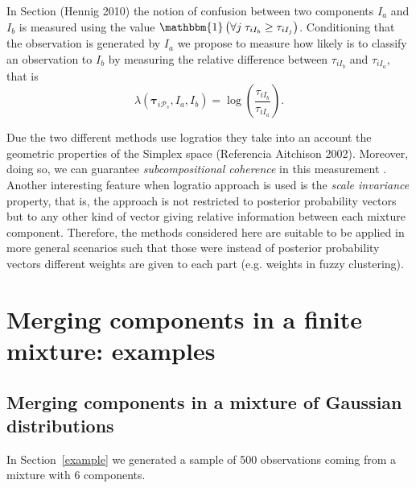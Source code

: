 \documentclass[10pt, a4paper]{article}
\newcommand{\m}[1]{\boldsymbol{#1}}
\begin{document}
\begin{spacing}{1.9}
In Section (Hennig 2010) the notion of confusion between two components $I_a$ and $I_b$ is measured  using the value $\mathbbm{1}\left( \forall j\; \tau_{i I_{b}} \geq \tau_{i I_j} \right)$. Conditioning that the observation is generated by $I_a$ we propose to measure how likely is to classify an observation to $I_b$ by measuring the relative difference between $\tau_{i I_b}$ and $\tau_{i I_a}$, that is 
\[
\lambda(\m\tau_{i \mathcal{P}_s},  I_a,  I_b) = \log \left(\frac{ \tau_{iI_b} }{ \tau_{iI_a} }\right).
\]

Due the two different methods use logratios they take into an account the geometric properties of the Simplex space (Referencia Aitchison 2002).  Moreover, doing so, we can guarantee \emph{subcompositional coherence} in this measurement \citep{aitchison1986statistical}. Another interesting feature when logratio approach is used is the \emph{scale invariance} property, that is, the approach is not restricted to posterior probability vectors but to any other kind of vector giving relative information between each mixture component. Therefore, the methods considered here are suitable to be applied in more general scenarios such that those were instead of posterior probability vectors different weights are given to each part (e.g. weights in fuzzy clustering).


\section{Merging components in a finite mixture: examples}\label{merging_examples_dist}

\subsection{Merging components in a mixture of Gaussian distributions}

In Section~\ref{example} we generated a sample of 500 observations coming from a mixture with 6 components. 



\end{spacing}
\end{document}
